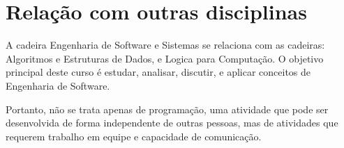 \documentclass[a4paper, 10pt]{article}
\begin{document}
\section{Relação com outras disciplinas}
A cadeira Engenharia de Software e Sistemas se relaciona com as cadeiras: Algoritmos e Estruturas de Dados, e Logica para Computação. O objetivo principal deste curso é estudar, analisar, discutir, e aplicar conceitos de Engenharia de Software. 

Portanto, não se trata apenas de programação, uma atividade que pode ser desenvolvida de forma independente de outras pessoas, mas de atividades que requerem trabalho em equipe e capacidade de comunicação. \citep{cinWiki}



\end{document}
